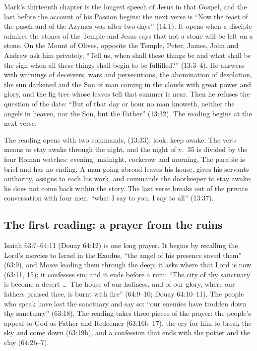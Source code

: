 Mark's thirteenth chapter is the longest speech of Jesus in that Gospel, and
the last before the account of his Passion begins: the next verse is ``Now the
feast of the pasch and of the Azymes was after two days'' (14:1). It opens
when a disciple admires the stones of the Temple and Jesus says that not a
stone will be left on a stone. On the Mount of Olives, opposite the Temple,
Peter, James, John and Andrew ask him privately, ``Tell us, when shall these
things be and what shall be the sign when all these things shall begin to be
fulfilled?'' (13:3--4). He answers with warnings of deceivers, wars and
persecutions, the abomination of desolation, the sun darkened and the Son of
man coming in the clouds with great power and glory, and the fig tree whose
leaves tell that summer is near. Then he refuses the question of the date:
``But of that day or hour no man knoweth, neither the angels in heaven, nor
the Son, but the Father'' (13:32). The reading begins at the next verse.

The reading opens with two commands,  (13:33): look,
keep awake. The verb  means to stay awake through the
night, and the night of v.~35 is divided by the four Roman watches: evening,
midnight, cockcrow and morning. The parable is brief and has no ending. A man
going abroad leaves his house, gives his servants authority, assigns to each
his work, and commands the doorkeeper to stay awake; he does not come back
within the story. The last verse breaks out of the private conversation with
four men: ``what I say to you, I say to all'' (13:37).

\subsection{The first reading: a prayer from the ruins}

Isaiah 63:7--64:11 (Douay 64:12) is one long prayer. It begins by recalling the Lord's
mercies to Israel in the Exodus, ``the angel of his presence saved them''
(63:9), and Moses leading them through the deep; it asks where that Lord is
now (63:11, 15); it confesses sin; and it ends before a ruin: ``The city of thy
sanctuary is become a desert \ldots\ The house of our holiness, and of our
glory, where our fathers praised thee, is burnt with fire'' (64:9--10; Douay
64:10--11). The people who speak have lost the sanctuary and say so: ``our
enemies have trodden down thy sanctuary'' (63:18). The reading takes three pieces of the prayer:
the people's appeal to God as Father and Redeemer (63:16b--17), the cry for him
to break the sky and come down (63:19b), and a confession that ends with the
potter and the clay (64:2b--7).

